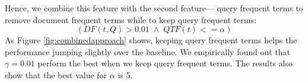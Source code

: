 Hence, we combine this feature with the second feature--- query frequent terms to remove document frequent terms while to keep query frequent terms:
\begin{displaymath}( DF(t, Q)>0.01 \; \wedge \; QTF(t)<=\alpha )\end{displaymath}
As Figure \ref{fig:combinedapproach} shows, keeping query frequent terms helps the performance jumping slightly over the baseline. We empirically found out that $\gamma=0.01$ perform the best when we keep query frequent terms. The results also show that the best value for $\alpha$ is 5.


